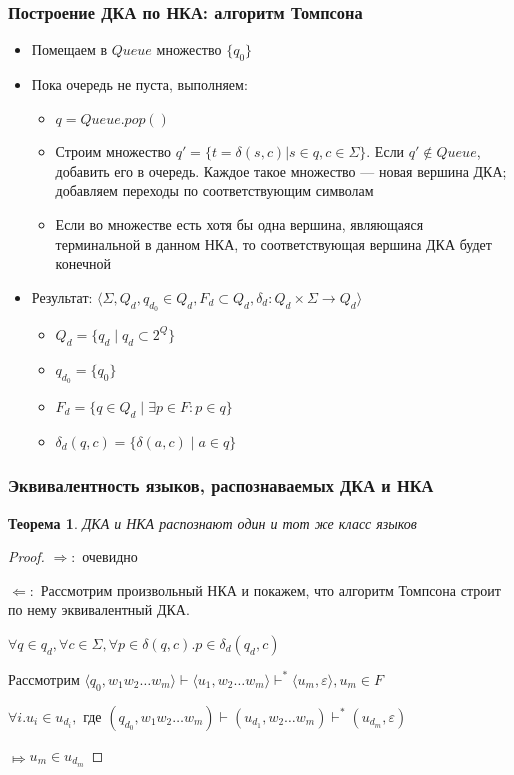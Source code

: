 \documentclass{beamer}
\newtheorem{rutheorem}{Теорема}
\begin{document}
\begin{frame}[fragile]
  \transwipe[direction=90]
  \frametitle{Построение ДКА по НКА: алгоритм Томпсона}
  \begin{itemize}
    \item Помещаем в $Queue$ множество $\{ q_0 \}$
    \item Пока очередь не пуста, выполняем:
    \begin{itemize}
      \item $q = Queue.pop()$
      \item Строим множество $q' = \{t = \delta (s, c) | s \in q, c \in \Sigma\}$. Если $q' \notin Queue$, добавить его в очередь. Каждое такое множество --- новая вершина ДКА; добавляем переходы по соответствующим символам
      \item Если во множестве есть хотя бы одна вершина, являющаяся терминальной в данном НКА, то соответствующая вершина ДКА будет конечной
    \end{itemize}
  \item Результат: $\langle \Sigma, Q_d, q_{d_0} \in Q_d, F_d \subset Q_d, \delta_d: Q_d \times \Sigma \rightarrow {Q_d} \rangle$
  \begin{itemize}
    \item $Q_d = \{q_d \mid q_d \subset 2^Q \}$
    \item $q_{d_0} = \{q_0\}$
    \item $F_d = \{q \in Q_d \mid \exists p \in F : p \in q\}$
    \item $\delta_d(q, c) = \{ \delta(a, c) \mid a \in q \}$
  \end{itemize}
  \end{itemize}
\end{frame}

\begin{frame}[fragile]
  \transwipe[direction=90]
  \frametitle{Эквивалентность языков, распознаваемых ДКА и НКА}
  \begin{rutheorem}
  ДКА и НКА распознают один и тот же класс языков
  \end{rutheorem}
  \begin{proof}
  $\Rightarrow: $ очевидно
  
  $\Leftarrow: $ Рассмотрим произвольный НКА и покажем, что алгоритм Томпсона строит по нему эквивалентный ДКА.

  $\forall q \in q_d, \forall c \in \Sigma, \forall p \in \delta(q, c). p \in \delta_d (q_d, c)$

  Рассмотрим $\langle q_0, w_1 w_2 \dots w_m \rangle \vdash \langle u_1, w_2 \dots w_m\rangle  \vdash^* \langle u_m, \varepsilon \rangle, u_m \in F $
  
  $\forall i. u_i \in u_{d_i}, $ где $(q_{d_0}, w_1 w_2 \dots w_m) \vdash (u_{d_1}, w_2 \dots w_m) \vdash^* (u_{d_m}, \varepsilon)$

  $\Mapsto u_m \in u_{d_m}$
  \end{proof}
\end{frame}
\end{document}
